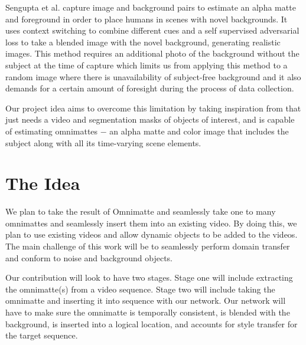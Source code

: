 \documentclass{article}
\begin{document}
Sengupta et al.\cite{BMSengupta20} capture image and background pairs to estimate an alpha matte and foreground in order to place humans in scenes with novel backgrounds. It uses context switching to combine different cues and a self supervised adversarial loss to take a blended image with the novel background, generating realistic images. This method requires an additional photo of the background without the subject at the time of capture which limits us from applying this method to a random image where there is unavailability of subject-free background and it also demands for a certain amount of foresight during the process of data collection. 

Our project idea aims to overcome this limitation\cite{BMSengupta20} by taking inspiration from\cite{lu2021} that just needs a video and segmentation masks of objects of interest, and is capable of estimating omnimattes $-$ an alpha matte and color image that includes the subject along with all its time-varying scene elements. 


\section{The Idea}
We plan to take the result of Omnimatte and seamlessly take one to many omnimattes and seamlessly insert them into an existing video. By doing this, we plan to use existing videos and allow dynamic objects to be added to the videos. The main challenge of this work will be to seamlessly perform domain transfer and conform to noise and background objects.


Our contribution will look to have two stages. Stage one will include extracting the omnimatte(s) from a video sequence. Stage two will include taking the omnimatte and inserting it into sequence with our network. Our network will have to make sure the omnimatte is temporally consistent, is blended with the background, is inserted into a logical location, and accounts for style transfer for the target sequence.
\end{document}
